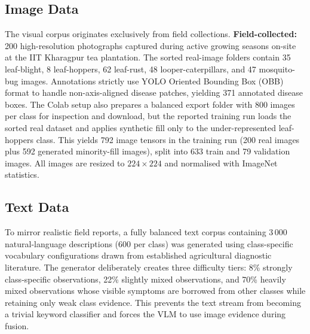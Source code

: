 \documentclass[12pt, a4paper, oneside]{Thesis}
\begin{document}
\subsection{Image Data}

The visual corpus originates exclusively from field collections. \textbf{Field-collected:} 200 high-resolution photographs captured during active growing seasons on-site at the IIT Kharagpur tea plantation. The sorted real-image folders contain 35 leaf-blight, 8 leaf-hoppers, 62 leaf-rust, 48 looper-caterpillars, and 47 mosquito-bug images. Annotations strictly use YOLO Oriented Bounding Box (OBB) format to handle non-axis-aligned disease patches, yielding 371 annotated disease boxes. The Colab setup also prepares a balanced export folder with 800 images per class for inspection and download, but the reported training run loads the sorted real dataset and applies synthetic fill only to the under-represented leaf-hoppers class. This yields 792 image tensors in the training run (200 real images plus 592 generated minority-fill images), split into 633 train and 79 validation images. All images are resized to $224{\times}224$ and normalised with ImageNet statistics.

\subsection{Text Data}

To mirror realistic field reports, a fully balanced text corpus containing 3\,000 natural-language descriptions (600 per class) was generated using class-specific vocabulary configurations drawn from established agricultural diagnostic literature. The generator deliberately creates three difficulty tiers: 8\% strongly class-specific observations, 22\% slightly mixed observations, and 70\% heavily mixed observations whose visible symptoms are borrowed from other classes while retaining only weak class evidence. This prevents the text stream from becoming a trivial keyword classifier and forces the VLM to use image evidence during fusion.
\end{document}
